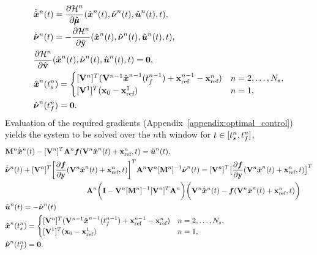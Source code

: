 \begin{align*}%
&\genstateDotArg{n}{t} = \frac{\partial \hamiltonianArg{n}}{\partial \adjointDiscreteDumArgnt{}{}}(\genstateArg{n}{t},\adjointOCArg{n}{t},\controllerArg{n}{t},t),\\%
&\adjointOCDotArg{n}{t}= - \frac{\partial \hamiltonianArg{n}}{\partial \genstateyDiscreteArgnt{}{}}(\genstateArg{n}{t},\adjointOCArg{n}{t},\controllerArg{n}{t},t),\\%
&\frac{\partial \hamiltonianArg{n}}{\partial \controllerDiscreteDumArgnt{}{}} (\genstateArg{n}{t},\adjointOCArg{n}{t},\controllerArg{n}{t},t) = \boldsymbol 0, \\
& \genstateArg{n}{\timeStartArg{n}} =
\begin{cases} \spatialIC & n = 2,\ldots,\nslabs,
 \\ \genstateICOne& n=1,\end{cases} \\
&\adjointOCArg{n}{\timeEndArg{n}}= \bz.
\end{align*}
Evaluation of the required gradients (Appendix~\ref{appendix:optimal_control}) yields the system to be solved over the $n$th window for $t \in [t_s^{n},t_f^{n}]$,
\begin{equation}\label{eq:sys_oc1}
\begin{split}
&\massArg{n}  \genstateDotArg{n}{t}  -  \basisspaceTArg{n} \stweightingMatArgt{n}{t} \velocity(\veloargsromn) =  \controllerArg{n}{t} , \\
 & \adjointOCDotArg{n}{t}  + \basisspaceTArg{n} \bigg[\frac{\partial \velocity}{\partial \stateyDiscrete} (\veloargsromn) \bigg]^T \stweightingMatArgt{n}{t} \basisspaceArg{n} [\massArg{n}]^{-1} \adjointOCArg{n}{t} =  \basisspaceTArg{n} \big[ \frac{\partial \velocity}{\partial \stateyDiscrete}(\veloargsromn) \big]^T \\
& \hspace{1.5in} \stweightingMatArgt{n}{t} \bigg( \mathbf{I} -   \basisspaceArg{n} [\massArg{n}]^{-1} \basisspaceTArg{n}  \stweightingMatArgt{n}{t} \bigg)  \bigg( \basisspaceArg{n}\genstateDotArg{n}{t}  -   \velocity(\veloargsromn) \bigg) \\%
&\controllerArg{n}{t} = -\adjointOCArg{n}{t} \\%
& \genstateArg{n}{\timeStartArg{n}} = 
\begin{cases}
\spatialIC& n=2,\ldots,\nslabs, \\
\genstateICOne & n=1,  
\end{cases} \\%
& \adjointOCArg{n}{\timeEndArg{n}} = \boldsymbol 0. \\%
\end{split}
\end{equation}
